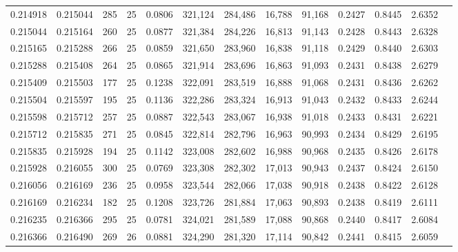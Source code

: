 \begin{tabular}{rrrrrrrrrrrrr}
0.214918 & 0.215044 &   285 &  25 &                                     0.0806 & 321,124 & 284,486 &  16,788 &  91,168 & 0.2427 & 0.8445 & 2.6352 \\
0.215044 & 0.215164 &   260 &  25 &                                     0.0877 & 321,384 & 284,226 &  16,813 &  91,143 & 0.2428 & 0.8443 & 2.6328 \\
0.215165 & 0.215288 &   266 &  25 &                                     0.0859 & 321,650 & 283,960 &  16,838 &  91,118 & 0.2429 & 0.8440 & 2.6303 \\
0.215288 & 0.215408 &   264 &  25 &                                     0.0865 & 321,914 & 283,696 &  16,863 &  91,093 & 0.2431 & 0.8438 & 2.6279 \\
0.215409 & 0.215503 &   177 &  25 &                                     0.1238 & 322,091 & 283,519 &  16,888 &  91,068 & 0.2431 & 0.8436 & 2.6262 \\
0.215504 & 0.215597 &   195 &  25 &                                     0.1136 & 322,286 & 283,324 &  16,913 &  91,043 & 0.2432 & 0.8433 & 2.6244 \\
0.215598 & 0.215712 &   257 &  25 &                                     0.0887 & 322,543 & 283,067 &  16,938 &  91,018 & 0.2433 & 0.8431 & 2.6221 \\
0.215712 & 0.215835 &   271 &  25 &                                     0.0845 & 322,814 & 282,796 &  16,963 &  90,993 & 0.2434 & 0.8429 & 2.6195 \\
0.215835 & 0.215928 &   194 &  25 &                                     0.1142 & 323,008 & 282,602 &  16,988 &  90,968 & 0.2435 & 0.8426 & 2.6178 \\
0.215928 & 0.216055 &   300 &  25 &                                     0.0769 & 323,308 & 282,302 &  17,013 &  90,943 & 0.2437 & 0.8424 & 2.6150 \\
0.216056 & 0.216169 &   236 &  25 &                                     0.0958 & 323,544 & 282,066 &  17,038 &  90,918 & 0.2438 & 0.8422 & 2.6128 \\
0.216169 & 0.216234 &   182 &  25 &                                     0.1208 & 323,726 & 281,884 &  17,063 &  90,893 & 0.2438 & 0.8419 & 2.6111 \\
0.216235 & 0.216366 &   295 &  25 &                                     0.0781 & 324,021 & 281,589 &  17,088 &  90,868 & 0.2440 & 0.8417 & 2.6084 \\
0.216366 & 0.216490 &   269 &  26 &                                     0.0881 & 324,290 & 281,320 &  17,114 &  90,842 & 0.2441 & 0.8415 & 2.6059 \\

\end{tabular}
